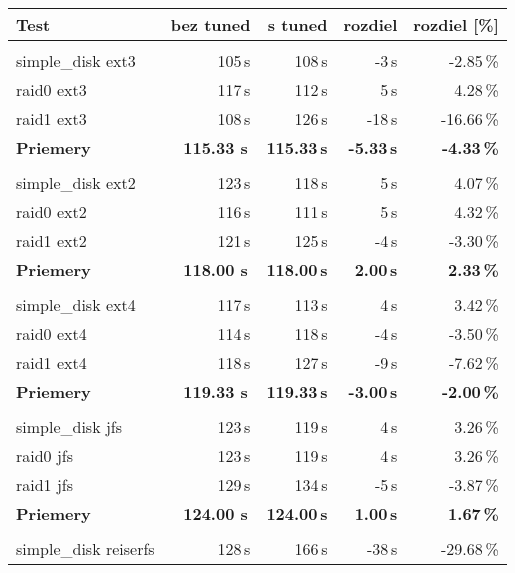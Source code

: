 {{{\renewcommand{\arraystretch}{1.1}
\begin{table}[H]
\begin{center}
\begin{tabular}{|l|r r r r|}
    \hline
    \textbf{Test} & \textbf{bez tuned} & \textbf{s tuned} & \textbf{rozdiel} & \textbf{rozdiel [\%]} \\
    \hline & \\[-1em]\hline
    simple\_disk ext3 & 105\,s & 108\,s & -3\,s & -2.85\,\% \\
    raid0 ext3 & 117\,s & 112\,s & 5\,s & 4.28\,\% \\
    raid1 ext3 & 108\,s & 126\,s & -18\,s & -16.66\,\% \\
    \hline
    \textbf{Priemery} & \textbf{115.33 s}\,& \textbf{115.33\,s} & \textbf{-5.33\,s} & \textbf{-4.33\,\%} \\
    \hline & \\[-1em]\hline
    simple\_disk ext2 & 123\,s & 118\,s & 5\,s & 4.07\,\% \\
    raid0 ext2 & 116\,s & 111\,s & 5\,s & 4.32\,\% \\
    raid1 ext2 & 121\,s & 125\,s & -4\,s & -3.30\,\% \\
    \hline
    \textbf{Priemery} & \textbf{118.00 s}\,& \textbf{118.00\,s} & \textbf{2.00\,s} & \textbf{2.33\,\%} \\
    \hline & \\[-1em]\hline
    simple\_disk ext4 & 117\,s & 113\,s & 4\,s & 3.42\,\% \\
    raid0 ext4 & 114\,s & 118\,s & -4\,s & -3.50\,\% \\
    raid1 ext4 & 118\,s & 127\,s & -9\,s & -7.62\,\% \\
    \hline
    \textbf{Priemery} & \textbf{119.33 s}\,& \textbf{119.33\,s} & \textbf{-3.00\,s} & \textbf{-2.00\,\%} \\
    \hline & \\[-1em]\hline
    simple\_disk jfs & 123\,s & 119\,s & 4\,s & 3.26\,\% \\
    raid0 jfs & 123\,s & 119\,s & 4\,s & 3.26\,\% \\
    raid1 jfs & 129\,s & 134\,s & -5\,s & -3.87\,\% \\
    \hline
    \textbf{Priemery} & \textbf{124.00 s}\,& \textbf{124.00\,s} & \textbf{1.00\,s} & \textbf{1.67\,\%} \\
    \hline & \\[-1em]\hline
    simple\_disk reiserfs & 128\,s & 166\,s & -38\,s & -29.68\,\% \\

\end{tabular}
\end{center}
\end{table}}}}
